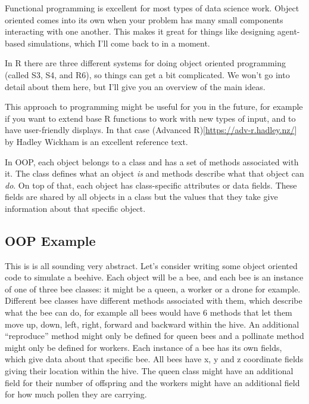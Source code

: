 \documentclass[
  12pt,
]{book}
\begin{document}
Functional programming is excellent for most types of data science work. Object oriented comes into its own when your problem has many small components interacting with one another. This makes it great for things like designing agent-based simulations, which I'll come back to in a moment.

In R there are three different systems for doing object oriented programming (called S3, S4, and R6), so things can get a bit complicated. We won't go into detail about them here, but I'll give you an overview of the main ideas.

This approach to programming might be useful for you in the future, for example if you want to extend base R functions to work with new types of input, and to have user-friendly displays. In that case (Advanced R){[}\url{https://adv-r.hadley.nz/}{]} by Hadley Wickham is an excellent reference text.

In OOP, each object belongs to a class and has a set of methods associated with it. The class defines what an object \emph{is} and methods describe what that object can \emph{do}. On top of that, each object has class-specific attributes or data fields. These fields are shared by all objects in a class but the values that they take give information about that specific object.

\hypertarget{oop-example}{%
\subsection{OOP Example}\label{oop-example}}

This is is all sounding very abstract. Let's consider writing some object oriented code to simulate a beehive. Each object will be a bee, and each bee is an instance of one of three bee classes: it might be a queen, a worker or a drone for example. Different bee classes have different methods associated with them, which describe what the bee can do, for example all bees would have 6 methods that let them move up, down, left, right, forward and backward within the hive. An additional ``reproduce'' method might only be defined for queen bees and a pollinate method might only be defined for workers. Each instance of a bee has its own fields, which give data about that specific bee. All bees have x, y and z coordinate fields giving their location within the hive. The queen class might have an additional field for their number of offspring and the workers might have an additional field for how much pollen they are carrying.
\end{document}
